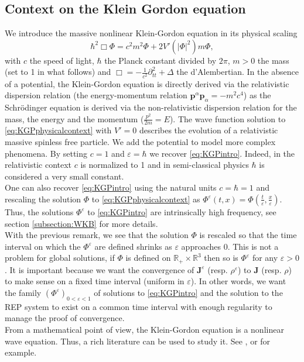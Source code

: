 \documentclass[a4paper, 15pt]{article}
\numberwithin{equation}{section}
\begin{document}
\subsection{Context on the Klein Gordon equation}
\label{subsection:contextKG}
We introduce the massive nonlinear Klein-Gordon equation in its physical scaling 
\begin{equation}
\label{eq:KGPphysicalcontext}	\hbar^2\Box\Phi=c^2m^2\Phi+2V'(|\Phi|^2)m\Phi,
\end{equation}
with $c$ the speed of light, $\hbar$ the Planck constant divided by $2\pi$, $m>0$ the mass (set to 1 in what follows) and $\Box=-\frac{1}{c^2}\partial_{tt}^2+\Delta$ the d'Alembertian. In the absence of a potential, the Klein-Gordon equation is directly derived via the relativistic dispersion relation (the energy-momentum relation $\textbf{p}^\alpha\textbf{p}_\alpha=-m^2c^4$) as the Schrödinger equation is derived via the non-relativistic dispersion relation for the mass, the energy and the momentum  ($\frac{p^2}{2m}=E$). The wave function solution to \eqref{eq:KGPphysicalcontext} with $V'=0$ describes the evolution of a relativistic massive spinless free particle. We add the potential to model more complex phenomena.
By setting $c=1$ and $\varepsilon=\hbar$ we recover \eqref{eq:KGPintro}. Indeed, in the relativistic context $c$ is normalized to 1 and in semi-classical physics $\hbar$ is considered a very small constant.\\
One can also recover \eqref{eq:KGPintro} using the natural units $c=\hbar=1$ and rescaling the solution $\Phi$ to \eqref{eq:KGPphysicalcontext} as $\Phi^\varepsilon(t,x)=\Phi(\frac{t}{\varepsilon},\frac{x}{\varepsilon})$. Thus, the solutions $\Phi^\varepsilon$  to \eqref{eq:KGPintro} are intrinsically high frequency, see section \ref{subsection:WKB} for more details.\\
With the previous remark, we see that the solution $\Phi$ is rescaled so that the time interval on which the $\Phi^\varepsilon$ are defined shrinks as $\varepsilon$ approaches 0. This is not a problem for global solutions, if $\Phi$ is defined on $\mathbb{R}_+\times\mathbb{R}^3$ then so is $\Phi^\varepsilon$ for any $\varepsilon>0$. It is important because we want the convergence of  $\textbf{J}^\varepsilon$ (resp. $\rho^\varepsilon$) to $\textbf{J}$ (resp. $\rho$) to make sense on a fixed time interval (uniform in $\varepsilon$). 
In other words, we want the family $(\Phi^\varepsilon)_{0<\varepsilon<1}$ of solutions to \eqref{eq:KGPintro} and the solution to the REP system to exist on a common time interval with enough regularity to manage the proof of convergence. \\
From a mathematical point of view, the Klein-Gordon equation is a nonlinear wave equation. Thus, a rich literature can be used to study it. See \cite{zbMATH05035890}, \cite{wang2015lectures} or \cite{luk2014introduction} for example.\\
\end{document}
